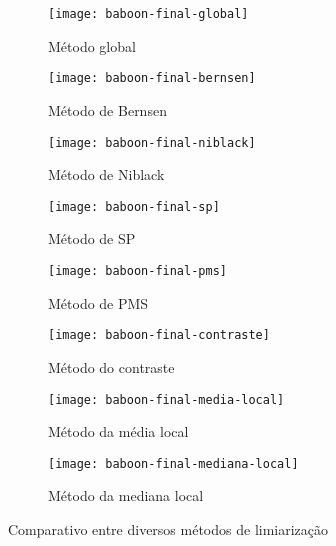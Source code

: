 \documentclass[brazilian,a4paper,twocolumn]{article}
\begin{document}
        \begin{figure}[H]
            \centering
            \begin{subfigure}{0.23\textwidth}
                \texttt{[image: baboon-final-global]}
                \caption{Método global}
                \label{fig:baboon-global}
            \end{subfigure}
            \begin{subfigure}{0.23\textwidth}
                \texttt{[image: baboon-final-bernsen]}
                \caption{Método de Bernsen}
                \label{fig:baboon-bernsen}
            \end{subfigure}
            \begin{subfigure}{0.23\textwidth}
                \texttt{[image: baboon-final-niblack]}
                \caption{Método de Niblack}
                \label{fig:baboon-niblack}
            \end{subfigure}
            \begin{subfigure}{0.23\textwidth}
                \texttt{[image: baboon-final-sp]}
                \caption{Método de SP}
                \label{fig:baboon-sp}
            \end{subfigure}
            \begin{subfigure}{0.23\textwidth}
                \texttt{[image: baboon-final-pms]}
                \caption{Método de PMS}
                \label{fig:baboon-pms}
            \end{subfigure}
            \begin{subfigure}{0.23\textwidth}
                \texttt{[image: baboon-final-contraste]}
                \caption{Método do contraste}
                \label{fig:baboon-contraste}
            \end{subfigure}
            \begin{subfigure}{0.23\textwidth}
                \texttt{[image: baboon-final-media-local]}
                \caption{Método da média local}
                \label{fig:baboon-media}
            \end{subfigure}
            \begin{subfigure}{0.23\textwidth}
                \texttt{[image: baboon-final-mediana-local]}
                \caption{Método da mediana local}
                \label{fig:baboon-mediana}
            \end{subfigure}

            \caption{Comparativo entre diversos métodos de limiarização}
            \label{fig:baboon-limiarizacao}
        \end{figure}
\end{document}
